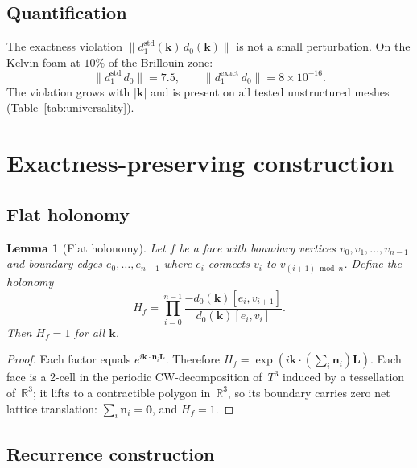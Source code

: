 \documentclass[preprint,12pt]{elsarticle}
\newtheorem{lemma}{Lemma}
\begin{document}
\subsection{Quantification}

The exactness violation $\|d_1^{\mathrm{std}}(\mathbf{k})\,d_0(\mathbf{k})\|$ is not a small perturbation. On the Kelvin foam at $10\%$ of the Brillouin zone:
\begin{equation}
  \|d_1^{\mathrm{std}}\,d_0\| = 7.5, \qquad
  \|d_1^{\mathrm{exact}}\,d_0\| = 8 \times 10^{-16}.
\end{equation}
The violation grows with $|\mathbf{k}|$ and is present on all tested unstructured meshes (Table~\ref{tab:universality}).

\section{Exactness-preserving construction}
\label{sec:construction}

\subsection{Flat holonomy}

\begin{lemma}[Flat holonomy]\label{lem:holonomy}
Let $f$ be a face with boundary vertices $v_0, v_1, \ldots, v_{n-1}$ and boundary edges $e_0, \ldots, e_{n-1}$ where $e_i$ connects $v_i$ to $v_{(i+1)\bmod n}$. Define the holonomy
\begin{equation}\label{eq:holonomy}
  H_f = \prod_{i=0}^{n-1} \frac{-d_0(\mathbf{k})[e_i, v_{i+1}]}{d_0(\mathbf{k})[e_i, v_i]}.
\end{equation}
Then $H_f = 1$ for all $\mathbf{k}$.
\end{lemma}

\begin{proof}
Each factor equals $e^{i\mathbf{k}\cdot\mathbf{n}_i\mathbf{L}}$. Therefore $H_f = \exp(i\mathbf{k}\cdot(\sum_i \mathbf{n}_i)\mathbf{L})$. Each face is a 2-cell in the periodic CW-decomposition of~$T^3$ induced by a tessellation of~$\mathbb{R}^3$; it lifts to a contractible polygon in~$\mathbb{R}^3$, so its boundary carries zero net lattice translation: $\sum_i \mathbf{n}_i = \mathbf{0}$, and $H_f = 1$.
\end{proof}

\subsection{Recurrence construction}
\end{document}
